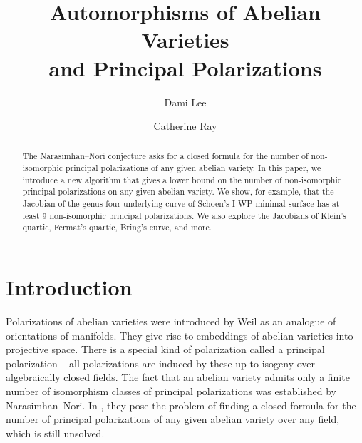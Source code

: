 \documentclass[12pt,reqno]{amsart}
\title[Automorphisms of Abelian Varieties and Principal Polarizations]{Automorphisms of Abelian Varieties \\ and Principal Polarizations}
\author{Dami Lee}
\author{Catherine Ray}
\theoremstyle{definition}
\theoremstyle{remark}
\begin{document}
  
\maketitle

\begin{abstract} %
The Narasimhan--Nori conjecture asks for a closed formula for the number of non-isomorphic principal polarizations of any given abelian variety. In this paper, we introduce a new algorithm that gives a lower bound on the number of non-isomorphic principal polarizations on any given abelian variety. We show, for example, that the Jacobian of the genus four underlying curve of Schoen's I-WP minimal surface has at least 9 non-isomorphic principal polarizations. We also explore the Jacobians of Klein's quartic, Fermat's quartic, Bring's curve, and more.   
\end{abstract}

\tableofcontents

\section{Introduction}


Polarizations of abelian varieties were introduced by Weil as an analogue of orientations of manifolds. They give rise to embeddings of abelian varieties into projective space. There is a special kind of polarization called a principal polarization -- all polarizations are induced by these up to isogeny over algebraically closed fields. The fact that an abelian variety admits only a finite number of isomorphism classes of principal polarizations was established by Narasimhan--Nori. In \cite{nn}, they pose the problem of finding a closed formula for the number of principal polarizations of any given abelian variety over any field, which is still unsolved. 
\end{document}
